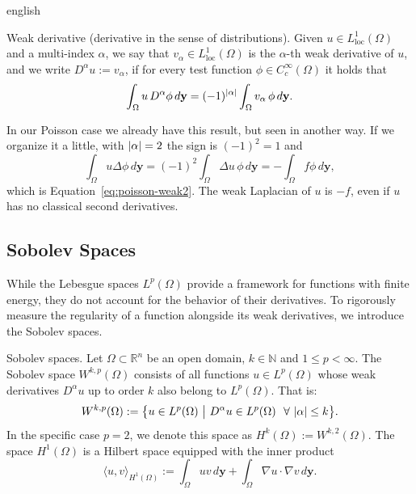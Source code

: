 \begin{hyphenrules}{english}
\begin{definicion}{Weak derivative (derivative in the sense of distributions).}\label{def:weak-derivative}
Given $u\in L^1_{\mathrm{loc}}(\Omega)$ and a multi-index $\alpha$, we say that
$v_\alpha\in L^1_{\mathrm{loc}}(\Omega)$ is the $\alpha$-th weak derivative of $u$, and we write
$D^\alpha u:=v_\alpha$, if for every test function $\phi\in C_c^\infty(\Omega)$ it holds that
\cite{reyna_sobolev}
\begin{equation}
  \int_\Omega u\,D^\alpha\phi\,d\mathbf{y}=(-1)^{\left\lvert \alpha \right\rvert}\int_\Omega v_\alpha\,\phi\,d\mathbf{y}.
  \label{eq:weak-derivative}
\end{equation}
\end{definicion}

In our Poisson case we already have this result, but seen in another way. If we organize it a little,
with $\left\lvert \alpha \right\rvert=2$ the sign is $(-1)^2=1$ and
\begin{equation}
  \int_\Omega u\Delta\phi\,d\mathbf{y}=(-1)^2\int_\Omega\Delta u\,\phi\,d\mathbf{y}=-\int_\Omega f\phi\,d\mathbf{y},
  \label{eq:weak-poisson-again}
\end{equation}
which is Equation~\eqref{eq:poisson-weak2}. The weak Laplacian of $u$ is $-f$, even if $u$ has no classical second
derivatives.

\subsection{Sobolev Spaces}\label{subsec:sobolev}

While the Lebesgue spaces $L^p(\Omega)$ provide a framework for functions with finite energy, they do
not account for the behavior of their derivatives. To rigorously measure the regularity of a function
alongside its weak derivatives, we introduce the Sobolev spaces.

\begin{definicion}{Sobolev spaces.}\label{def:sobolev}
Let $\Omega\subset\mathbb{R}^n$ be an open domain, $k\in\mathbb{N}$ and $1\le p<\infty$. The Sobolev space
$W^{k,p}(\Omega)$ consists of all functions $u\in L^p(\Omega)$ whose weak derivatives $D^\alpha u$ up to
order $k$ also belong to $L^p(\Omega)$. That is:
\begin{equation}
  W^{k,p}(\Omega):=\big\{u\in L^p(\Omega)\ \big|\ D^\alpha u\in L^p(\Omega)\ \ \forall\,\abs{\alpha}\le k\big\}.
  \label{eq:sobolev}
\end{equation}
In the specific case $p=2$, we denote this space as $H^k(\Omega):=W^{k,2}(\Omega)$. The space
$H^1(\Omega)$ is a Hilbert space equipped with the inner product
\begin{equation}
  \langle u,v\rangle_{H^1(\Omega)}:=\int_\Omega uv\,d\mathbf{y}+\int_\Omega\nabla u\cdot\nabla v\,d\mathbf{y}.
  \label{eq:h1-inner}
\end{equation}
\end{definicion}


\end{hyphenrules}
